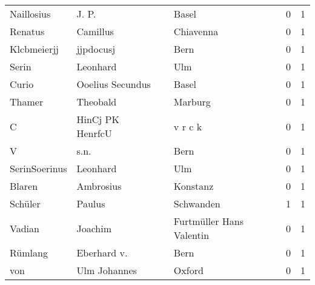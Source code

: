 \documentclass[10pt,a4paper,landscape]{article}
\begin{document}
\begin{longtable}{llllrr}
               Naillosius &                              J. P. &             &                                       Basel &          0 &         1 \\
                  Renatus &                           Camillus &             &                                   Chiavenna &          0 &         1 \\
              Klcbmeierjj &                          jjpdocusj &             &                                        Bern &          0 &         1 \\
                    Serin &                           Leonhard &             &                                         Ulm &          0 &         1 \\
                    Curio &                   Ooelius Secundus &             &                                       Basel &          0 &         1 \\
                   Thamer &                           Theobald &             &                                     Marburg &          0 &         1 \\
                        C &                   HinCj PK HenrfcU &             &                                     v r c k &          0 &         1 \\
                        V &                               s.n. &             &                                        Bern &          0 &         1 \\
            SerinSoerinus &                           Leonhard &             &                                         Ulm &          0 &         1 \\
                   Blaren &                          Ambrosius &             &                                    Konstanz &          0 &         1 \\
                  Schüler &                             Paulus &             &                                   Schwanden &          1 &         1 \\
                   Vadian &                            Joachim &             &                    Furtmüller Hans Valentin &          0 &         1 \\
                  Rümlang &                        Eberhard v. &             &                                        Bern &          0 &         1 \\
                      von &                       Ulm Johannes &             &                                      Oxford &          0 &         1 \\

\end{longtable}
\end{document}
